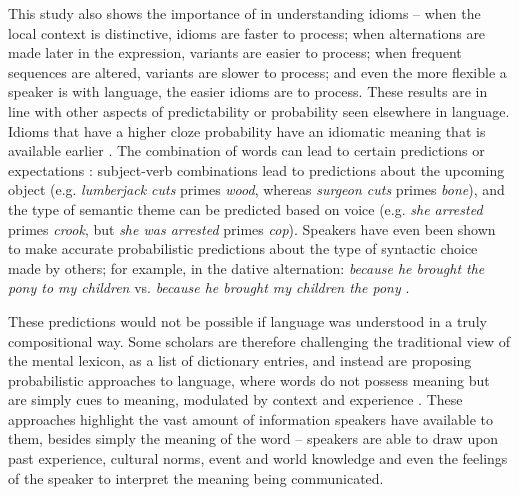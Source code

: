 \documentclass[output=paper
,modfonts
,nonflat]{langsci/langscibook}
\begin{document}
This study also shows the importance of  in understanding idioms -- when the local context is distinctive, idioms are faster to process; when alternations are made later in the expression, variants are easier to process; when frequent sequences are altered, variants are slower to process; and even the more flexible a speaker is with language, the easier idioms are to process. These results are in line with other aspects of predictability or probability seen elsewhere in language. Idioms that have a higher cloze probability have an idiomatic meaning that is available earlier \citep{CacciariTabossi1988, TitoneConnine1994b}. The combination of words can lead to certain predictions or expectations \citep{Elman2011}: subject-verb combinations lead to predictions about the upcoming object (e.g. \textit{lumberjack cuts} primes \textit{wood}, whereas \textit{surgeon cuts} primes \textit{bone}), and the type of semantic theme can be predicted based on voice (e.g. \textit{she arrested} primes \textit{crook}, but \textit{she was arrested} primes \textit{cop}). Speakers have even been shown to make accurate probabilistic predictions about the type of syntactic choice made by others; for example, in the dative alternation: \textit{because he brought the pony to my children} vs. \textit{because he brought my children the pony} \citep{Bresnan2007}.

These predictions would not be possible if language was understood in a truly compositional way. Some scholars are therefore challenging the traditional view of the mental lexicon, as a list of dictionary entries, and instead are proposing probabilistic approaches to language, where words do not possess meaning but are simply cues to meaning, modulated by context and experience \citep{Elman2004, Elman2011, RamscarBaayen2013, RamscarBaayen2013}. These approaches highlight the vast amount of information speakers have available to them, besides simply the meaning of the word -- speakers are able to draw upon past experience, cultural norms, event and world knowledge and even the feelings of the speaker to interpret the meaning being communicated. 
\end{document}
